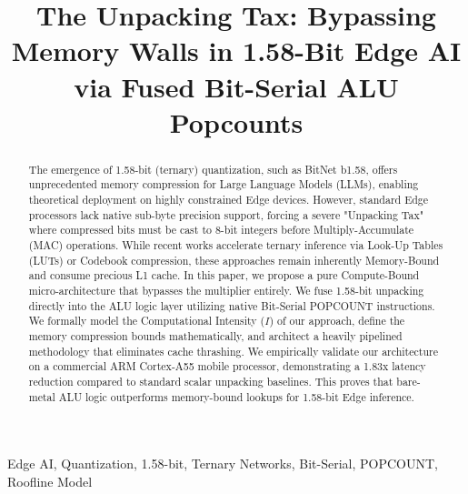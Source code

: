 \documentclass[10pt, conference]{IEEEtran}
\begin{document}
\title{The Unpacking Tax: Bypassing Memory Walls in 1.58-Bit Edge AI via Fused Bit-Serial ALU Popcounts}

\author{
}

\maketitle




\begin{abstract}
The emergence of 1.58-bit (ternary) quantization, such as BitNet b1.58, offers unprecedented memory compression for Large Language Models (LLMs), enabling theoretical deployment on highly constrained Edge devices. However, standard Edge processors lack native sub-byte precision support, forcing a severe "Unpacking Tax" where compressed bits must be cast to 8-bit integers before Multiply-Accumulate (MAC) operations. While recent works accelerate ternary inference via Look-Up Tables (LUTs) or Codebook compression, these approaches remain inherently Memory-Bound and consume precious L1 cache. In this paper, we propose a pure Compute-Bound micro-architecture that bypasses the multiplier entirely. We fuse 1.58-bit unpacking directly into the ALU logic layer utilizing native Bit-Serial POPCOUNT instructions. We formally model the Computational Intensity ($I$) of our approach, define the memory compression bounds mathematically, and architect a heavily pipelined methodology that eliminates cache thrashing. We empirically validate our architecture on a commercial ARM Cortex-A55 mobile processor, demonstrating a 1.83x latency reduction compared to standard scalar unpacking baselines. This proves that bare-metal ALU logic outperforms memory-bound lookups for 1.58-bit Edge inference.
\end{abstract}

\begin{IEEEkeywords}
Edge AI, Quantization, 1.58-bit, Ternary Networks, Bit-Serial, POPCOUNT, Roofline Model
\end{IEEEkeywords}
\end{document}

